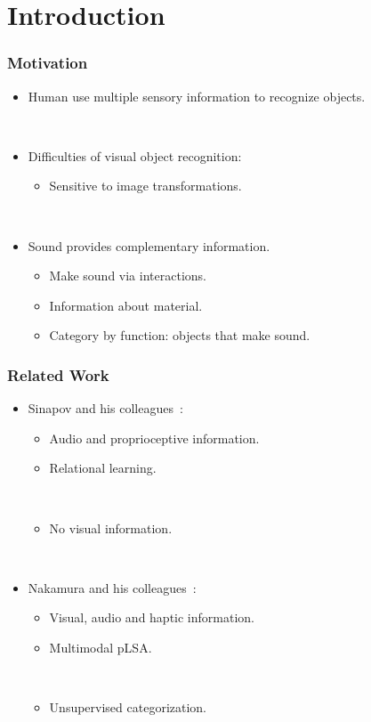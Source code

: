 \documentclass{beamer}
\begin{document}
\section{Introduction}
\begin{frame}
  \frametitle{Motivation}

  \begin{itemize}
    \item Human use multiple sensory information to recognize objects.

      ~
    \item Difficulties of visual object recognition:
      \begin{itemize}
        \item Sensitive to image transformations. 
      \end{itemize}

      ~
    \item Sound provides complementary information.
      \begin{itemize}
        \item Make sound via interactions.
        \item Information about material. 
        \item Category by function: objects that make sound.
      \end{itemize}
  \end{itemize}
\end{frame}

\begin{frame}
  \frametitle{Related Work}

  \begin{itemize}
    \item Sinapov and his colleagues~\cite{sinapov_interactive_2009,sinapov_object_2011}: 
      \begin{itemize}
        \item Audio and proprioceptive information.
        \item Relational learning.

          ~
        \item No visual information.
      \end{itemize}

      ~
    \item Nakamura and his colleagues~\cite{nakamura_multimodal_2007,nakamura_bag_2012}:
      \begin{itemize}
        \item Visual, audio and haptic information.
        \item Multimodal pLSA.

          ~
        \item Unsupervised categorization.
      \end{itemize}
  \end{itemize}
\end{frame}
\end{document}
